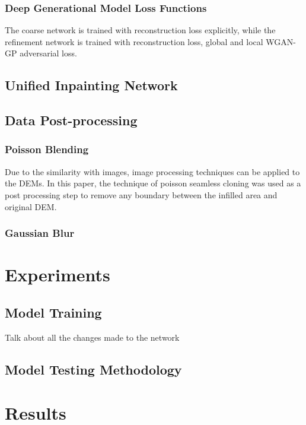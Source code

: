 \documentclass[twocolumn]{article}
\begin{document}
\subsubsection{Deep Generational Model Loss Functions}
\label{sec:org483edf5}
The coarse network is trained with reconstruction loss explicitly, while the refinement network is trained with reconstruction loss, global and local WGAN-GP adversarial loss.\autocite{yuGenerativeImageInpainting2018}
\subsection{Unified Inpainting Network}
\label{sec:org3e837df}
\subsection{Data Post-processing}
\label{sec:orgf603b37}
\subsubsection{Poisson Blending}
\label{sec:orgbe4a351}
Due to the similarity with images, image processing techniques can be applied to the DEMs.
In this paper, the technique of poisson seamless cloning\autocite{perezPoissonImageEditing2003} was used as a post processing step to remove any boundary between the infilled area and original DEM.

\subsubsection{Gaussian Blur}
\label{sec:org8296968}


\section{Experiments}
\label{sec:org6c79095}
\subsection{Model Training}
\label{sec:org2d7c91d}
Talk about all the changes made to the network
\subsection{Model Testing Methodology}
\label{sec:org9d729c6}


\section{Results}
\label{sec:org3936a68}
\end{document}
